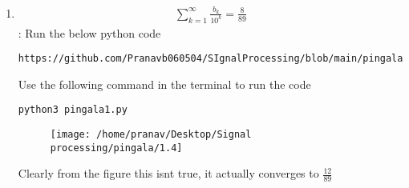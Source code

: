 \documentclass[journal,12pt,twocolumn]{IEEEtran}
\renewcommand\thesection{\arabic{section}}
\begin{document}
\begin{enumerate}[label=\thesection.\arabic*
,ref=\thesection.\theenumi]
\begin{lstlisting}
https://github.com/Pranavb060504/SIgnalProcessing/blob/main/pingala/codes/pingala1.py
\end{lstlisting}
Use the following command in the terminal to run the code
\begin{lstlisting}
python3 pingala1.py
\end{lstlisting}
\begin{figure}[h]
\centering
\texttt{[image: /home/pranav/Desktop/Signal processing/pingala/1.3]}
\caption{}
\end{figure}
 \item 
\begin{align}
	\sum_{k=1}^{\infty}\frac{b_k}{10^k} =\frac{8}{89}
\end{align}
\solution:
Run the below python code 
\begin{lstlisting}
https://github.com/Pranavb060504/SIgnalProcessing/blob/main/pingala/codes/pingala1.py
\end{lstlisting}
Use the following command in the terminal to run the code
\begin{lstlisting}
python3 pingala1.py
\end{lstlisting}
\begin{figure}[h]
\centering
\texttt{[image: /home/pranav/Desktop/Signal processing/pingala/1.4]}
\caption{}
\end{figure}
Clearly from the figure this isnt true, it actually converges to $\frac{12}{89}$
\end{enumerate}
\end{document}

